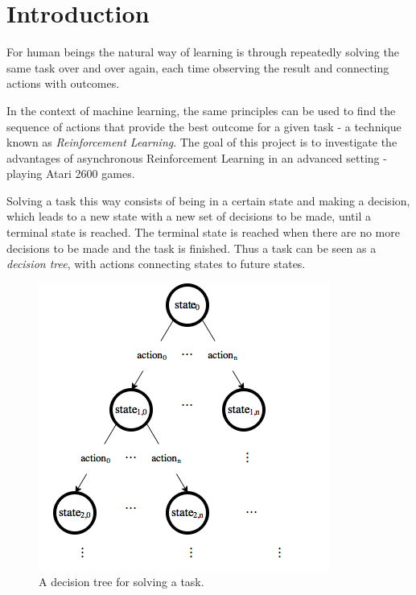 \documentclass[11pt]{article}
\begin{document}
\maketitle

\section{Introduction}

For human beings the natural way of learning is through repeatedly solving the same
task over and over again, each time observing the result and connecting
actions with outcomes.

In the context of machine learning, the same principles can be used to find the
sequence of actions that provide the best outcome for a given task
- a technique known as \textit{Reinforcement Learning}.
The goal of this project is to investigate the advantages of asynchronous Reinforcement
Learning in an advanced setting - playing Atari 2600 games\cite{openAIEnvs}.

Solving a task this way consists of being in a certain state and making a decision,
which leads to a new state with a new set of decisions to be made, until
a terminal state is reached.
The terminal state is reached when there are no more decisions to be made
and the task is finished.
Thus a task can be seen as a \textit{decision tree}, with actions connecting states to future states.
\begin{figure}[H]
    \centering
    \includegraphics[scale=0.5]{include/decision_tree.png}
    \caption{A decision tree for solving a task.}
    \label{fig:dec_tree}
\end{figure}
\end{document}
